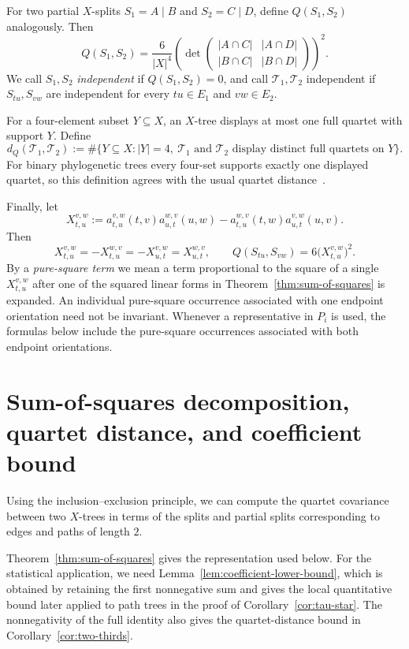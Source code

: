 \documentclass[pdflatex,sn-mathphys-num]{sn-jnl}
\theoremstyle{thmstyleone}
\begin{document}
For two partial $X$-splits $S_1=A\mid B$ and $S_2=C\mid D$, define
$Q(S_1,S_2)$ analogously.  Then
\[
 Q(S_1,S_2)=\frac6{|X|^4}
 \left(\det\!\begin{pmatrix}
 |A\cap C|&|A\cap D|\\
 |B\cap C|&|B\cap D|
 \end{pmatrix}
 \right)^2.
\]
We call $S_1,S_2$ \emph{independent} if $Q(S_1,S_2)=0$, and call
$\mathcal T_1,\mathcal T_2$ independent if $S_{tu},S_{vw}$ are
independent for every $tu\in E_1$ and $vw\in E_2$.

For a four-element subset $Y\subseteq X$, an $X$-tree displays at most one
full quartet with support $Y$.  Define
\[
d_Q(\mathcal T_1,\mathcal T_2)
:=\#\{Y\subseteq X:|Y|=4,\ \mathcal T_1\text{ and }\mathcal T_2
\text{ display distinct full quartets on }Y\}.
\]
For binary phylogenetic trees every four-set supports exactly one displayed
quartet, so this definition agrees with the usual quartet
distance~\cite{SteelPenny1993}.

Finally, let
\[
X_{t,u}^{v,w}:=
a_{t,u}^{v,w}(t,v)a_{u,t}^{w,v}(u,w)
-a_{t,u}^{w,v}(t,w)a_{u,t}^{v,w}(u,v).
\]
Then
\[
X_{t,u}^{v,w}=-X_{t,u}^{w,v}=-X_{u,t}^{v,w}=X_{u,t}^{w,v},
\qquad
Q(S_{tu},S_{vw})=6\bigl(X_{t,u}^{v,w}\bigr)^2.
\]
By a \emph{pure-square term} we mean a term proportional to the square of a
single $X_{t,u}^{v,w}$ after one of the squared linear forms in
Theorem~\ref{thm:sum-of-squares} is expanded.  An individual pure-square
occurrence associated with one endpoint orientation need not be invariant.
Whenever a representative in $P_i$ is used, the formulas below include the
pure-square occurrences associated with both endpoint orientations.

\section{Sum-of-squares decomposition, quartet distance, and coefficient bound}
\label{sec:sos}

Using the inclusion--exclusion principle, we can compute the quartet
covariance between two $X$-trees in terms of the splits and partial
splits corresponding to edges and paths of length $2$.

Theorem~\ref{thm:sum-of-squares} gives the representation used below.  For the
statistical application, we need Lemma~\ref{lem:coefficient-lower-bound},
which is obtained by retaining the first nonnegative sum and gives the local
quantitative bound later applied to path trees in the proof of
Corollary~\ref{cor:tau-star}.  The nonnegativity of the full identity also
gives the quartet-distance bound in Corollary~\ref{cor:two-thirds}.
\end{document}
